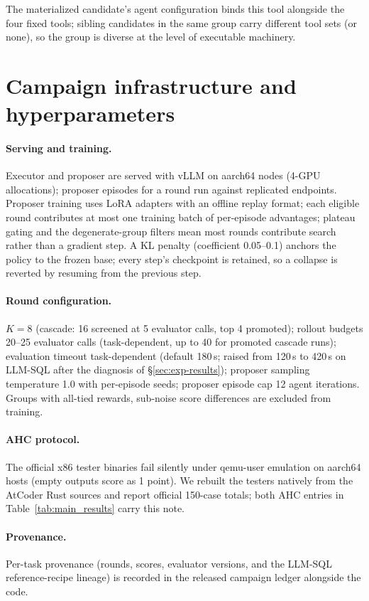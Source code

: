 The materialized candidate's agent configuration binds this tool alongside
the four fixed tools; sibling candidates in the same group carry different
tool sets (or none), so the group is diverse at the level of executable
machinery.

\section{Campaign infrastructure and hyperparameters}
\label{app:infra}

\paragraph{Serving and training.}  Executor and proposer are served with
vLLM on aarch64 nodes (4-GPU allocations); proposer episodes for a round run
against replicated endpoints.  Proposer training uses LoRA adapters with an
offline replay format; each eligible round contributes at most one
training batch of per-episode advantages; plateau gating and the degenerate-group
filters mean most rounds contribute search rather than a gradient step.  A KL penalty (coefficient 0.05--0.1) anchors the
policy to the frozen base; every step's checkpoint is retained, so a collapse is
reverted by resuming from the previous step.

\paragraph{Round configuration.}  $K{=}8$ (cascade: 16 screened at 5
evaluator calls, top 4 promoted); rollout budgets 20--25 evaluator calls
(task-dependent, up to 40 for promoted cascade runs); evaluation timeout task-dependent
(default 180\,s; raised from 120\,s to 420\,s on LLM-SQL after the diagnosis of
\S\ref{sec:exp-results});
proposer sampling temperature 1.0 with per-episode seeds; proposer episode
cap 12 agent iterations.  Groups with all-tied rewards, sub-noise score
differences are excluded from training.

\paragraph{AHC protocol.}  The official x86 tester binaries fail silently
under qemu-user emulation on aarch64 hosts (empty outputs score as 1 point).
We rebuilt the testers natively from the AtCoder Rust sources and report
official 150-case totals; both AHC entries in Table~\ref{tab:main_results}
carry this note.

\paragraph{Provenance.}  Per-task provenance (rounds, scores, evaluator
versions, and the LLM-SQL reference-recipe lineage) is recorded in the
released campaign ledger alongside the code.
